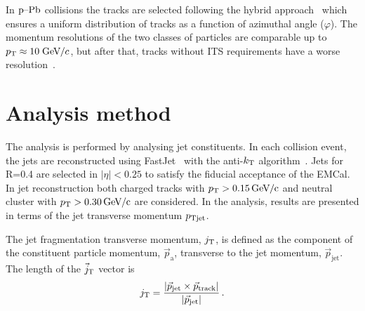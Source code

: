 In $\mbox{p--Pb}$ collisions the tracks are selected following the hybrid approach~\cite{hybridExplanation} which ensures a uniform distribution of tracks as a function of azimuthal angle ($\varphi$). The momentum resolutions of the two classes of particles are comparable up to $p_{\rm T} \approx 10\;\mathrm{GeV}\kern-0.05em/\kern-0.02em c$, but after that, tracks without ITS requirements have a worse resolution~\cite{alicePerformance,aliceBackgroundFluctuation}.

\section{Analysis method}
\label{sec:methods}

The analysis is performed by analysing jet constituents. In each collision event, the jets are reconstructed using FastJet~\cite{fastjet} with the anti-$k_{\rm T}$ algorithm~\cite{antikt}. Jets for R=0.4 are selected in $\left| \eta \right| < 0.25 $ to satisfy the fiducial acceptance of the EMCal. In jet reconstruction both charged tracks with $\pt{}>\unit[0.15]{\GeVc}$ and neutral cluster with $\pt{}>\unit[0.30]{\GeVc}$ are considered. In the analysis, results are presented in terms of the jet transverse momentum $p_{\rm Tjet}$.

The jet fragmentation transverse momentum, $j_{\rm T}$, is defined as the component of the constituent particle momentum, $\vec{p}_{\mathrm{a}}$, transverse to the jet momentum, $\vec{p}_{\mathrm{jet}}$.
The length of the $\vec{j}_{\rm T}$ vector is
  \begin{equation}
    j_{\rm T} = \frac{|\vec{p}_{\mathrm{jet}} \times \vec{p}_{\mathrm{track}}|}{|\vec{p}_{\mathrm{jet}}|} \,.
  \label{eq:jtdefinition}
  \end{equation}

